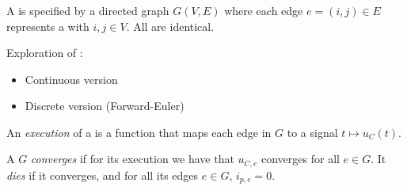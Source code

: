 \documentclass[	hyperref={pdfpagelabels=false}, xcolor=dvipsnames,
		11pt]{beamer}
\begin{document}
\begin{frame}
    \frametitle{\Pns}

    A \Pn is specified by a directed graph $G(V,E)$ where each edge $e = (i, j) \in E$ represents a \Pe with $i, j \in V$. All \Pes are identical.

    \begin{block}{Exploration of \Pns:}

    	\begin{itemize}
    		\item Continuous version
    		\item Discrete version (Forward-Euler)
    	\end{itemize}

    \end{block}

    An \emph{execution} of a \Pn is a function that maps each edge in $G$ to a signal $t \mapsto u_C(t)$.

    A \Pn $G$ \emph{converges} if for its execution we have that $u_{C,e}$ converges for all $e \in G$. It \emph{dies} if it converges, and for all its edges $e \in G$, $i_{p,e} = 0$.
\end{frame}
\end{document}
